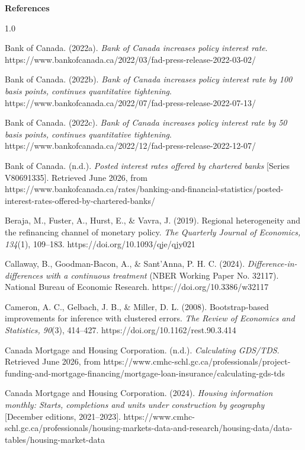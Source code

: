 \documentclass[12pt]{article}
\newcommand{\refitem}[1]{\par\noindent\hangindent=0.5in\hangafter=1 #1\vspace{6pt}}
\begin{document}
\newpage
\begin{center}\textbf{\Large References}\end{center}
\begin{spacing}{1.0}

\refitem{Bank of Canada. (2022a). \textit{Bank of Canada increases policy interest rate}. https://www.bankofcanada.ca/2022/03/fad-press-release-2022-03-02/}

\refitem{Bank of Canada. (2022b). \textit{Bank of Canada increases policy interest rate by 100 basis points, continues quantitative tightening}. https://www.bankofcanada.ca/2022/07/fad-press-release-2022-07-13/}

\refitem{Bank of Canada. (2022c). \textit{Bank of Canada increases policy interest rate by 50 basis points, continues quantitative tightening}. https://www.bankofcanada.ca/2022/12/fad-press-release-2022-12-07/}

\refitem{Bank of Canada. (n.d.). \textit{Posted interest rates offered by chartered banks} [Series V80691335]. Retrieved June 2026, from https://www.bankofcanada.ca/rates/banking-and-financial-statistics/posted-interest-rates-offered-by-chartered-banks/}

\refitem{Beraja, M., Fuster, A., Hurst, E., \& Vavra, J. (2019). Regional heterogeneity and the refinancing channel of monetary policy. \textit{The Quarterly Journal of Economics, 134}(1), 109--183. https://doi.org/10.1093/qje/qjy021}

\refitem{Callaway, B., Goodman-Bacon, A., \& Sant'Anna, P. H. C. (2024). \textit{Difference-in-differences with a continuous treatment} (NBER Working Paper No. 32117). National Bureau of Economic Research. https://doi.org/10.3386/w32117}

\refitem{Cameron, A. C., Gelbach, J. B., \& Miller, D. L. (2008). Bootstrap-based improvements for inference with clustered errors. \textit{The Review of Economics and Statistics, 90}(3), 414--427. https://doi.org/10.1162/rest.90.3.414}

\refitem{Canada Mortgage and Housing Corporation. (n.d.). \textit{Calculating GDS/TDS}. Retrieved June 2026, from https://www.cmhc-schl.gc.ca/professionals/project-funding-and-mortgage-financing/mortgage-loan-insurance/calculating-gds-tds}

\refitem{Canada Mortgage and Housing Corporation. (2024). \textit{Housing information monthly: Starts, completions and units under construction by geography} [December editions, 2021--2023]. https://www.cmhc-schl.gc.ca/professionals/housing-markets-data-and-research/housing-data/data-tables/housing-market-data}


\end{spacing}
\end{document}
